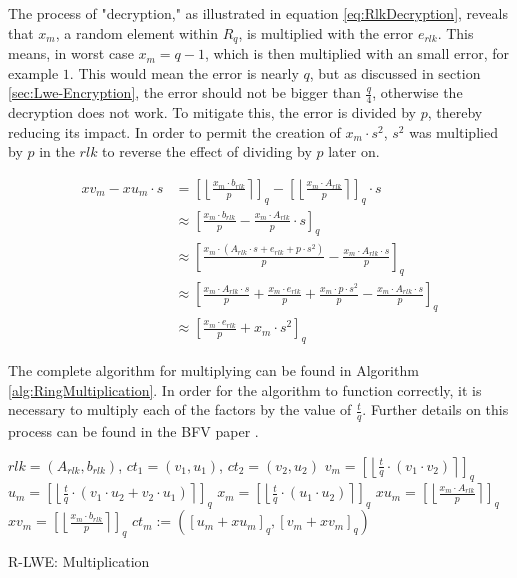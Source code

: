 The process of "decryption," as illustrated in equation \ref{eq:RlkDecryption}, reveals that $x_m$, a random element within $R_q$, is multiplied with the error $e_{rlk}$. This means, in worst case $x_m = q-1$, which is then multiplied with an small error, for example $1$. This would mean the error is nearly $q$, but as discussed in section \ref{sec:Lwe-Encryption}, the error should not be bigger than $\frac{q}{4}$, otherwise the decryption does not work. To mitigate this, the error is divided by $p$, thereby reducing its impact. In order to permit the creation of $x_m \cdot s^2$, $s^2$ was multiplied by $p$ in the $rlk$ to reverse the effect of dividing by $p$ later on.

\begin{equation}
  \begin{split}
    xv_m - xu_m \cdot s & = \left[\left\lfloor \frac{x_m \cdot b_{rlk}}{p}  \right\rceil \right]_q - \left[\left\lfloor \frac{x_m \cdot A_{rlk}}{p}  \right\rceil \right]_q \cdot s  \\
                        & \approx \left[\frac{x_m \cdot b_{rlk}}{p} - \frac{x_m \cdot A_{rlk}}{p} \cdot s\right]_q                                                                   \\
                        & \approx \left[\frac{x_m \cdot (A_{rlk}\cdot s+e_{rlk}+p\cdot s^2)}{p} - \frac{x_m \cdot A_{rlk} \cdot s}{p}\right]_q                                       \\
                        & \approx \left[\frac{x_m \cdot A_{rlk}\cdot s}{p}+\frac{x_m \cdot e_{rlk}}{p}+\frac{x_m \cdot p\cdot s^2}{p} - \frac{x_m \cdot A_{rlk} \cdot s}{p}\right]_q \\
                        & \approx \left[\frac{x_m \cdot e_{rlk}}{p}+ x_m \cdot s^2 \right]_q
  \end{split}
  \label{eq:RlkDecryption}
\end{equation}

The complete algorithm for multiplying can be found in Algorithm \ref{alg:RingMultiplication}. In order for the algorithm to function correctly, it is necessary to multiply each of the factors by the value of $\frac{t}{q}$. Further details on this process can be found in the BFV paper \cite{bfv}.

\begin{algorithm}[htb]
  \begin{algorithmic}[1]
    \REQUIRE $rlk=(A_{rlk}, b_{rlk})$, $ct_1 = (v_1, u_1)$, $ct_2 = (v_2, u_2)$
    \STATE $v_m = \left[\left\lfloor \frac{t}{q}\cdot (v_1 \cdot v_2)\right\rceil\right] _q $
    \STATE $u_m = \left[\left\lfloor \frac{t}{q}\cdot(v_1 \cdot u_2 + v_2 \cdot u_1)\right\rceil\right] _q$
    \STATE $x_m = \left[\left\lfloor \frac{t}{q}\cdot(u_1 \cdot u_2)\right\rceil\right] _q$
    \STATE $xu_m = \left[\left\lfloor \frac{x_m \cdot A_{rlk}}{p}  \right\rceil \right]_q$
    \STATE $xv_m = \left[\left\lfloor \frac{x_m \cdot b_{rlk}}{p}  \right\rceil \right]_q$
    \RETURN $ct_m:=(\left[u_m + xu_m\right]_q , \left[v_m + xv_m\right]_q )$
  \end{algorithmic}
  \caption{R-LWE: Multiplication}
  \label{alg:RingMultiplication}
\end{algorithm}

